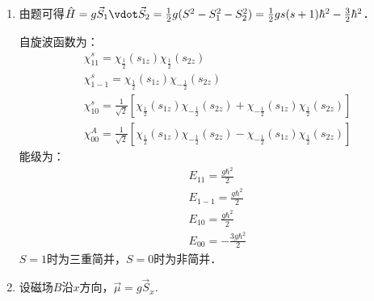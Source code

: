 \subsection{ }
\begin{enumerate}
\item 由题可得$\hat{H} = g \vec{S}_{1}\vdot \vec{S}_{2} = \frac{1}{2}g(S^{2}-S^{2}_{1}-S^{2}_{2}) = \frac{1}{2}gs(s+1)\hbar^{2}-\frac{3}{2}\hbar^2 $．

自旋波函数为：
\begin{align}
& \chi^{s}_{11} = \chi_{\frac{1}{2}}(s_{1z})\chi_{\frac{1}{2}}(s_{2z}) \\
& \chi^{s}_{1-1} = \chi_{\frac{1}{2}}(s_{1z})\chi_{-\frac{1}{2}}(s_{2z}) \\
&\chi^{s}_{10} = \frac{1}{\sqrt{2}} \left[ \chi_{\frac{1}{2}}(s_{1z})\chi_{-\frac{1}{2}}(s_{2z}) + \chi_{-\frac{1}{2}}(s_{1z})\chi_{\frac{1}{2}}(s_{2z})  \right] \\
&\chi^{A}_{00} = \frac{1}{\sqrt{2}} \left[ \chi_{\frac{1}{2}}(s_{1z})\chi_{-\frac{1}{2}}(s_{2z}) - \chi_{-\frac{1}{2}}(s_{1z})\chi_{\frac{1}{2}}(s_{2z})  \right]
\end{align}
能级为：
\begin{align}
&E_{11} =\frac{g\hbar^{2}}{2}  \\
&E_{1-1} =\frac{g\hbar^{2}}{2}  \\
&E_{10} =\frac{g\hbar^{2}}{2}  \\
&E_{00} =-\frac{3g\hbar^{2}}{2}  
\end{align}
$S=1$时为三重简并，$S=0$时为非简并．
\item 设磁场$B$沿$x$方向，$\vec{\mu} = g \vec{S}_{x} $.
\end{enumerate}

